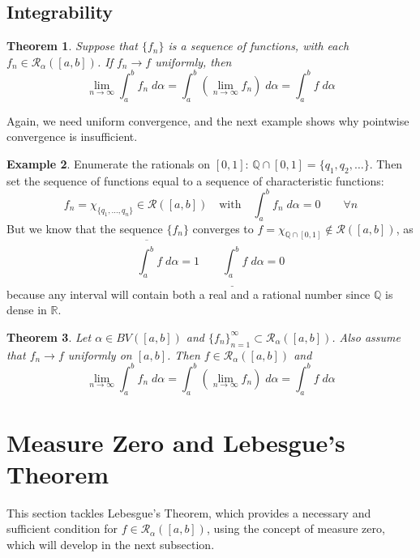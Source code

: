 \documentclass[12pt]{article}
\theoremstyle{plain}
\newtheorem{thm}{Theorem}[subsection]
\theoremstyle{definition}
\newtheorem{ex}[thm]{Example}
\theoremstyle{remark}
\begin{document}
\newpage
\subsection{Integrability}

\begin{thm}
Suppose that $\{f_n\}$ is a sequence of functions, with each $f_n\in\mathscr{R}_\alpha([a,b])$. If $f_n\rightarrow f$ uniformly,
then 
\[ 
    \lim_{n\rightarrow\infty} \int^b_a f_n\;d\alpha
    = \int^b_a \left(\lim_{n\rightarrow\infty} f_n \right)\;
    d\alpha = \int^b_a f\;d\alpha
\]
\end{thm}

Again, we need uniform convergence, and the next example shows why pointwise convergence is insufficient.

\begin{ex}
    \label{Qex}
    Enumerate the rationals on $[0,1]$: $\mathbb{Q}\cap[0,1] = \{q_1, q_2, \ldots\}$. Then set the sequence of functions equal to a sequence of characteristic functions:
\[ 
    f_n = \chi_{\{q_1, \ldots, q_n\}} \in \mathscr{R}([a,b])
    \quad \text{with} \quad
    \int^b_a f_n \; d\alpha = 0
    \qquad \forall n
\]
But we know that the sequence $\{f_n\}$ converges to $f=\chi_{\mathbb{Q}\cap [0,1]}\not\in\mathscr{R}([a,b])$, as
\[
    \overline{\int_a^b} f \; d\alpha = 1 
    \qquad 
    \underline{\int_a^b} f \; d\alpha = 0
\]
because any interval will contain both a real and a rational number since $\mathbb{Q}$ is dense in $\mathbb{R}$.
\end{ex}

\begin{thm}
Let $\alpha\in BV([a,b])$ and $\{f_n\}_{n=1}^\infty\subset \mathscr{R}_\alpha([a,b])$. Also assume that $f_n\rightarrow f$ uniformly on $[a,b]$. Then $f\in\mathscr{R}_\alpha([a,b])$ and 
\[ 
    \lim_{n\rightarrow\infty} \int^b_a f_n\;d\alpha
    = \int^b_a \left(\lim_{n\rightarrow\infty} f_n \right)\;
    d\alpha = \int^b_a f\;d\alpha
\]

\end{thm}



\newpage
\section{Measure Zero and Lebesgue's Theorem}

This section tackles Lebesgue's Theorem, which provides a necessary and sufficient condition for $f\in\mathscr{R}_\alpha([a,b])$, using the concept of measure zero, which will develop in the next subsection.
\end{document}
